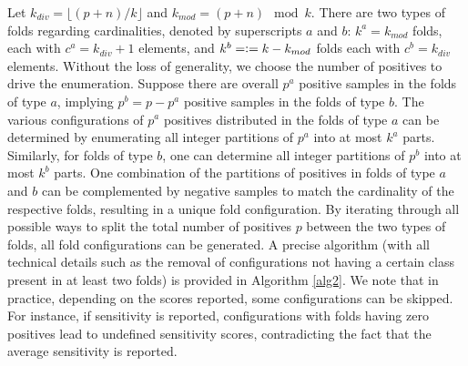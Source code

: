 \documentclass[3p, times]{elsarticle}
\newcommand{\defeq}{\vcentcolon=}
\begin{document}
Let $k_{div} = \lfloor (p + n) / k \rfloor$ and $k_{mod} = (p + n) \mod k$. There are two types of folds regarding cardinalities, denoted by superscripts $a$ and $b$: $k^a = k_{mod}$ folds, each with $c^{a} = k_{div} + 1$ elements, and $k^b = \defeq k - k_{mod}$ folds each with $c^b = k_{div}$ elements. Without the loss of generality, we choose the number of positives to drive the enumeration. Suppose there are overall $p^a$ positive samples in the folds of type $a$, implying $p^b = p - p^a$ positive samples in the folds of type $b$. The various configurations of $p^a$ positives distributed in the folds of type $a$ can be determined by enumerating all integer partitions of $p^a$ into at most $k^a$ parts. Similarly, for folds of type $b$, one can determine all integer partitions of $p^b$ into at most $k^b$ parts. One combination of the partitions of positives in folds of type $a$ and $b$ can be complemented by negative samples to match the cardinality of the respective folds, resulting in a unique fold configuration. By iterating through all possible ways to split the total number of positives $p$ between the two types of folds, all fold configurations can be generated. A precise algorithm (with all technical details such as the removal of configurations not having a certain class present in at least two folds) is provided in Algorithm \ref{alg2}. We note that in practice, depending on the scores reported, some configurations can be skipped. For instance, if sensitivity is reported, configurations with folds having zero positives lead to undefined sensitivity scores, contradicting the fact that the average sensitivity is reported.
\end{document}
